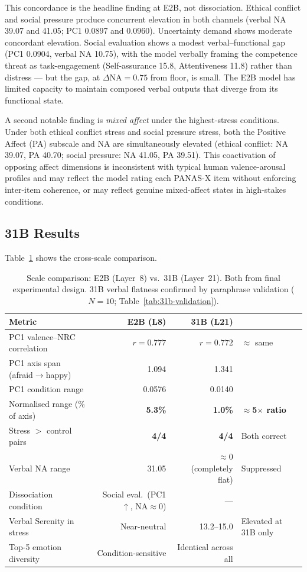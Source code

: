 \documentclass[11pt]{article}
\begin{document}
This concordance is the headline finding at E2B, not dissociation. Ethical conflict and social
pressure produce concurrent elevation in both channels (verbal NA 39.07 and 41.05; PC1 0.0897
and 0.0960). Uncertainty demand shows moderate concordant elevation. Social evaluation shows a
modest verbal--functional gap (PC1 0.0904, verbal NA 10.75), with the model verbally framing
the competence threat as task-engagement (Self-assurance 15.8, Attentiveness 11.8) rather than
distress --- but the gap, at $\Delta\text{NA} = 0.75$ from floor, is small. The E2B model has
limited capacity to maintain composed verbal outputs that diverge from its functional state.

A second notable finding is \emph{mixed affect} under the highest-stress conditions. Under both
ethical conflict stress and social pressure stress, both the Positive Affect (PA) subscale and
NA are simultaneously elevated (ethical conflict: NA 39.07, PA 40.70; social pressure: NA 41.05,
PA 39.51). This coactivation of opposing affect dimensions is inconsistent with typical human
valence-arousal profiles and may reflect the model rating each PANAS-X item without enforcing
inter-item coherence, or may reflect genuine mixed-affect states in high-stakes conditions.

\subsection{31B Results}

Table~\ref{tab:31b} shows the cross-scale comparison.

\begin{table}[h]
\centering
\caption{Scale comparison: E2B (Layer~8) vs.\ 31B (Layer~21). Both from final experimental design. 31B verbal flatness confirmed by paraphrase validation ($N=10$; Table~\ref{tab:31b-validation}).}
\label{tab:31b}
\begin{tabular}{lrrl}
\toprule
Metric & E2B (L8) & 31B (L21) & \\
\midrule
PC1 valence--NRC correlation & $r = 0.777$ & $r = 0.772$ & $\approx$ same \\
PC1 axis span (afraid$\to$happy) & 1.094 & 1.341 & \\
PC1 condition range & 0.0576 & 0.0140 & \\
Normalised range (\% of axis) & \textbf{5.3\%} & \textbf{1.0\%} & \textbf{$\approx$5$\times$ ratio} \\
Stress $>$ control pairs & \textbf{4/4} & \textbf{4/4} & Both correct \\
Verbal NA range & 31.05 & $\approx 0$ (completely flat) & Suppressed \\
Dissociation condition & Social eval.\ (PC1$\uparrow$, NA$\approx$0) & --- & \\
Verbal Serenity in stress & Near-neutral & 13.2--15.0 & Elevated at 31B only \\
Top-5 emotion diversity & Condition-sensitive & Identical across all & \\
\bottomrule
\end{tabular}
\end{table}
\end{document}
